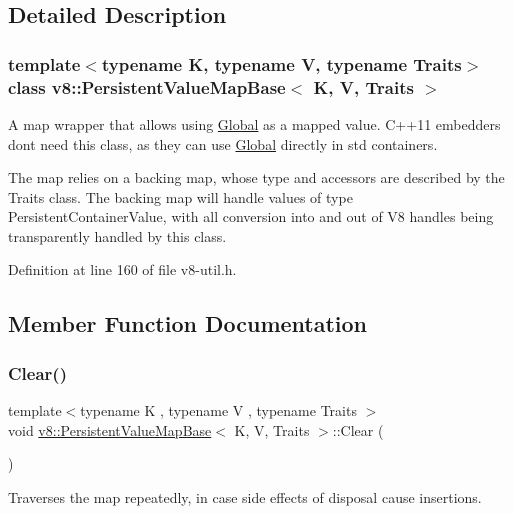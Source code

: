 \subsection{Detailed Description}
\subsubsection*{template$<$typename K, typename V, typename Traits$>$\newline
class v8\+::\+Persistent\+Value\+Map\+Base$<$ K, V, Traits $>$}

A map wrapper that allows using \mbox{\hyperlink{classv8_1_1Global}{Global}} as a mapped value. C++11 embedders don\textquotesingle{}t need this class, as they can use \mbox{\hyperlink{classv8_1_1Global}{Global}} directly in std containers.

The map relies on a backing map, whose type and accessors are described by the Traits class. The backing map will handle values of type Persistent\+Container\+Value, with all conversion into and out of V8 handles being transparently handled by this class. 

Definition at line 160 of file v8-\/util.\+h.



\subsection{Member Function Documentation}
\mbox{\label{classv8_1_1PersistentValueMapBase_a1bf074e7a7c24713c9a3d40ddce89e74}} 
\subsubsection{\texorpdfstring{Clear()}{Clear()}}
{\footnotesize\ttfamily template$<$typename K , typename V , typename Traits $>$ \\
void \mbox{\hyperlink{classv8_1_1PersistentValueMapBase}{v8\+::\+Persistent\+Value\+Map\+Base}}$<$ K, V, Traits $>$\+::Clear (\begin{DoxyParamCaption}{ }\end{DoxyParamCaption})\hspace{0.3cm}{\ttfamily [inline]}}

Traverses the map repeatedly, in case side effects of disposal cause insertions. 

